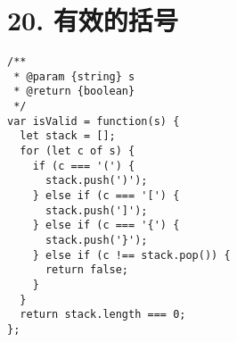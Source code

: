 \newpage
\section{20. 有效的括号}
\label{leetcode:20}

\begin{verbatim}
/**
 * @param {string} s
 * @return {boolean}
 */
var isValid = function(s) {
  let stack = [];
  for (let c of s) {
    if (c === '(') {
      stack.push(')');
    } else if (c === '[') {
      stack.push(']');
    } else if (c === '{') {
      stack.push('}');
    } else if (c !== stack.pop()) {
      return false;
    }
  }
  return stack.length === 0;
};
\end{verbatim}
